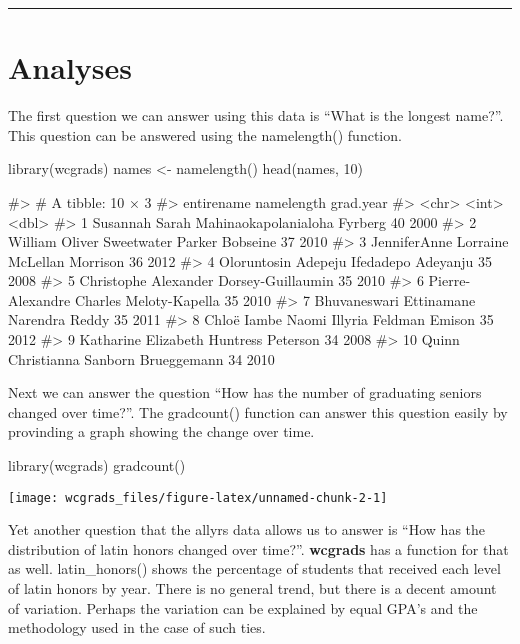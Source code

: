 \begin{center}\rule{0.5\linewidth}{\linethickness}\end{center}

\section{Analyses}\label{analyses}

The first question we can answer using this data is ``What is the
longest name?''. This question can be answered using the namelength()
function.

\begin{Schunk}
\begin{Sinput}
library(wcgrads)
names <- namelength()
head(names, 10)
\end{Sinput}
\begin{Soutput}
#> # A tibble: 10 × 3
#>                                     entirename namelength grad.year
#>                                          <chr>      <int>     <dbl>
#> 1  Susannah Sarah Mahinaokapolanialoha Fyrberg         40      2000
#> 2    William Oliver Sweetwater Parker Bobseine         37      2010
#> 3      JenniferAnne Lorraine McLellan Morrison         36      2012
#> 4       Oloruntosin Adepeju Ifedadepo Adeyanju         35      2008
#> 5       Christophe Alexander Dorsey-Guillaumin         35      2010
#> 6      Pierre-Alexandre Charles Meloty-Kapella         35      2010
#> 7       Bhuvaneswari Ettinamane Narendra Reddy         35      2011
#> 8     Chloë Iambe Naomi Illyria Feldman Emison         35      2012
#> 9        Katharine Elizabeth Huntress Peterson         34      2008
#> 10       Quinn Christianna Sanborn Brueggemann         34      2010
\end{Soutput}
\end{Schunk}

Next we can answer the question ``How has the number of graduating
seniors changed over time?''. The gradcount() function can answer this
question easily by provinding a graph showing the change over time.

\begin{Schunk}
\begin{Sinput}
library(wcgrads)
gradcount()
\end{Sinput}

\texttt{[image: wcgrads\_files/figure-latex/unnamed-chunk-2-1]} \end{Schunk}

Yet another question that the allyrs data allows us to answer is ``How
has the distribution of latin honors changed over time?''.
\textbf{wcgrads} has a function for that as well. latin\_honors() shows
the percentage of students that received each level of latin honors by
year. There is no general trend, but there is a decent amount of
variation. Perhaps the variation can be explained by equal GPA's and the
methodology used in the case of such ties.

